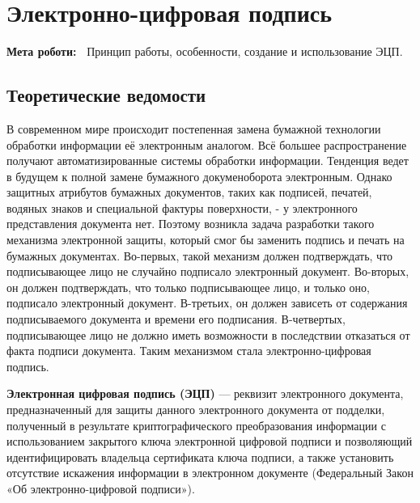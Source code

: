 \chapter{Электронно-цифровая подпись} \label{chapt4}%
\textbf{Мета роботи:~}%
Принцип работы, особенности, создание и использование ЭЦП.
\section{Теоретические ведомости} \label{sect4_a}

В современном мире происходит постепенная замена бумажной технологии
обработки информации её электронным аналогом. Всё большее распространение
получают автоматизированные системы обработки информации. Тенденция ведет в
будущем к полной замене бумажного докуменоборота электронным. Однако защитных
атрибутов бумажных документов, таких как подписей, печатей, водяных знаков и
специальной фактуры поверхности,  - у электронного представления документа
нет. Поэтому возникла задача разработки такого механизма электронной защиты,
который смог бы заменить подпись и печать на бумажных документах. Во-первых,
такой механизм должен подтверждать, что подписывающее лицо не случайно
подписало электронный документ. Во-вторых, он должен подтверждать, что только
подписывающее лицо, и только оно, подписало электронный документ. В-третьих,
он должен зависеть от содержания подписываемого документа и времени его
подписания. В-четвертых, подписывающее лицо не должно иметь возможности в
последствии отказаться от факта подписи документа. Таким механизмом стала
электронно-цифровая подпись.

\textbf{Электронная цифровая подпись (ЭЦП)} --- реквизит электронного
документа, предназначенный для защиты данного электронного документа от
подделки, полученный в результате криптографического преобразования
информации с использованием закрытого ключа электронной цифровой подписи и
позволяющий идентифицировать владельца сертификата ключа подписи, а также
установить отсутствие искажения информации в электронном документе
(Федеральный Закон «Об электронно-цифровой подписи»).


